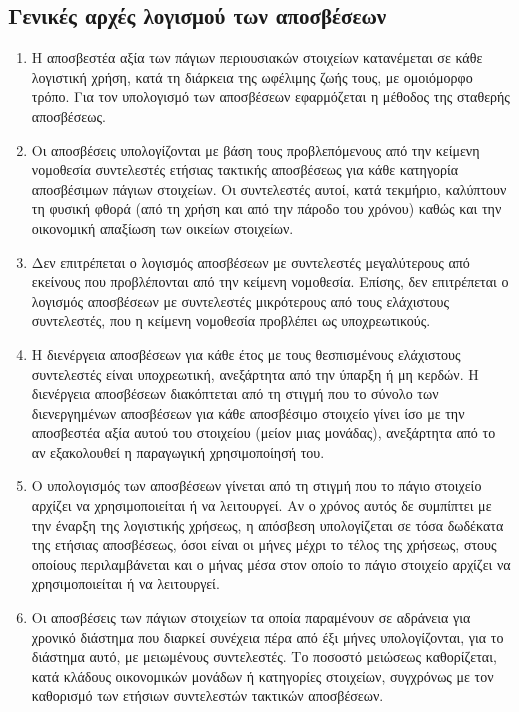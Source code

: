 \documentclass[A4,10pt,greek]{book}
\begin{document}
\subsection{Γενικές αρχές λογισμού των αποσβέσεων}
\begin{enumerate}
\item Η αποσβεστέα αξία των πάγιων περιουσιακών στοιχείων κατανέμεται σε κάθε λογιστική χρήση, κατά τη διάρκεια της ωφέλιμης ζωής τους, με ομοιόμορφο τρόπο.  Για τον υπολογισμό των αποσβέσεων εφαρμόζεται η μέθοδος της σταθερής αποσβέσεως.

\item Οι αποσβέσεις υπολογίζονται με βάση τους προβλεπόμενους από την κείμενη νομοθεσία συντελεστές ετήσιας τακτικής αποσβέσεως για κάθε κατηγορία αποσβέσιμων πάγιων στοιχείων. Οι συντελεστές αυτοί, κατά τεκμήριο, καλύπτουν τη φυσική φθορά (από τη χρήση και από την πάροδο του χρόνου) καθώς και την οικονομική απαξίωση των οικείων στοιχείων.

\item Δεν επιτρέπεται ο λογισμός αποσβέσεων με συντελεστές μεγαλύτερους από εκείνους που προβλέπονται από την κείμενη νομοθεσία. Επίσης, δεν επιτρέπεται ο λογισμός αποσβέσεων με συντελεστές μικρότερους από τους ελάχιστους συντελεστές, που η κείμενη νομοθεσία προβλέπει ως υποχρεωτικούς.

\item Η διενέργεια αποσβέσεων για κάθε έτος με τους θεσπισμένους ελάχιστους συντελεστές είναι υποχρεωτική, ανεξάρτητα από την ύπαρξη ή μη κερδών. Η διενέργεια αποσβέσεων διακόπτεται από τη στιγμή που το σύνολο των διενεργημένων αποσβέσεων για κάθε αποσβέσιμο στοιχείο γίνει ίσο με την αποσβεστέα αξία αυτού του στοιχείου (μείον μιας μονάδας), ανεξάρτητα από το αν εξακολουθεί η παραγωγική χρησιμοποίησή του.

\item Ο υπολογισμός των αποσβέσεων γίνεται από τη στιγμή που το πάγιο στοιχείο αρχίζει να χρησιμοποιείται ή να λειτουργεί. Αν ο χρόνος αυτός δε συμπίπτει με την έναρξη της λογιστικής χρήσεως, η απόσβεση υπολογίζεται σε τόσα δωδέκατα της ετήσιας αποσβέσεως, όσοι είναι οι μήνες μέχρι το τέλος της χρήσεως, στους οποίους περιλαμβάνεται και ο μήνας μέσα στον οποίο το πάγιο στοιχείο αρχίζει να χρησιμοποιείται ή να λειτουργεί.

\item Οι αποσβέσεις των πάγιων στοιχείων τα οποία παραμένουν σε αδράνεια για χρονικό διάστημα που διαρκεί συνέχεια πέρα από έξι μήνες υπολογίζονται, για το διάστημα αυτό, με μειωμένους συντελεστές. Το ποσοστό μειώσεως καθορίζεται, κατά κλάδους οικονομικών μονάδων ή κατηγορίες στοιχείων, συγχρόνως με τον καθορισμό των ετήσιων συντελεστών τακτικών αποσβέσεων.
\end{enumerate}
\end{document}
